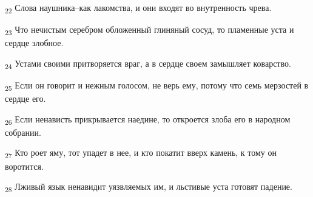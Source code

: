 \begin{tcolorbox}
\textsubscript{22} Слова наушника--как лакомства, и они входят во внутренность чрева.
\end{tcolorbox}
\begin{tcolorbox}
\textsubscript{23} Что нечистым серебром обложенный глиняный сосуд, то пламенные уста и сердце злобное.
\end{tcolorbox}
\begin{tcolorbox}
\textsubscript{24} Устами своими притворяется враг, а в сердце своем замышляет коварство.
\end{tcolorbox}
\begin{tcolorbox}
\textsubscript{25} Если он говорит и нежным голосом, не верь ему, потому что семь мерзостей в сердце его.
\end{tcolorbox}
\begin{tcolorbox}
\textsubscript{26} Если ненависть прикрывается наедине, то откроется злоба его в народном собрании.
\end{tcolorbox}
\begin{tcolorbox}
\textsubscript{27} Кто роет яму, тот упадет в нее, и кто покатит вверх камень, к тому он воротится.
\end{tcolorbox}
\begin{tcolorbox}
\textsubscript{28} Лживый язык ненавидит уязвляемых им, и льстивые уста готовят падение.
\end{tcolorbox}
